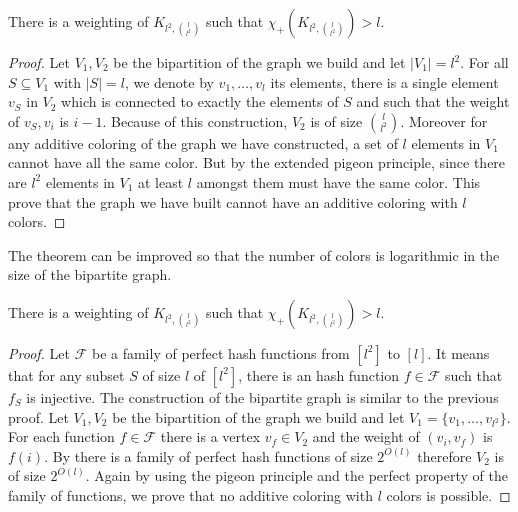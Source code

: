 \documentclass{article}
\begin{document}
\begin{theorem}
 There is a weighting of $K_{l^2,\binom{l}{l^2}}$ such that 
 $\chi_{+}(K_{l^2,\binom{l}{l^2}}) > l$.
\end{theorem}

\begin{proof}
Let $V_1, V_2$ be the bipartition of the graph we build and let $|V_1| = l^2$. 
For all $S \subseteq V_1$ with $|S| = l$, we denote by $v_1,\dots,v_l$ its elements,
there is a single element $v_S$ in $V_2$ which is connected to exactly the elements of $S$
and such that the weight of $v_S,v_i$ is $i-1$. Because of this construction, $V_2$ is of size
$\binom{l}{l^2}$. Moreover for any additive coloring of the graph we have constructed,
a set of $l$ elements in $V_1$ cannot have all the same color. But by the extended pigeon principle, since there 
are $l^2$ elements in $V_1$ at least $l$ amongst them must have the same color. 
This prove that the graph we have built cannot have an additive coloring with $l$ colors.
\end{proof}

The theorem can be improved so that the number of colors is logarithmic in 
the size of the bipartite graph.

\begin{theorem}
 There is a weighting of $K_{l^2,\binom{l}{l^2}}$ such that 
 $\chi_{+}(K_{l^2,\binom{l}{l^2}}) > l$.
\end{theorem}

\begin{proof}
 Let $\mathcal{F}$ be a family of perfect  hash functions from $[l^2]$ to $[l]$. It means that for any 
 subset $S$ of size $l$ of $[l^2]$, there is an hash function $f \in \mathcal{F}$ such that $f_S$ is injective.
 The construction of the bipartite graph is similar to the previous proof. 
 Let $V_1, V_2$ be the bipartition of the graph we build and let $V_1 = \{v_1,\dots,v_{l^2}\}$. 
 For each function $f \in \mathcal{F}$ there is a vertex $v_f \in V_2$ and the weight of $(v_i,v_f)$ is $f(i)$.
 By \cite{schmidt1990spatial,alon1995color} there is a family of perfect hash functions of size $2^{O(l)}$ therefore $V_2$ is of size $2^{O(l)}$.
 Again by using the pigeon principle and the perfect property of the family of functions, we prove that no additive coloring with $l$ colors is possible.
\end{proof}

\end{document}

